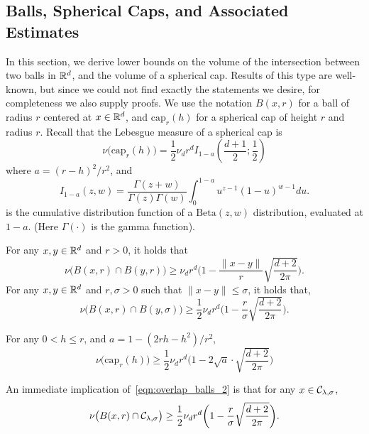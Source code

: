 \subsection{Balls, Spherical Caps, and Associated Estimates}
\label{subsec:spherical_caps}
In this section, we derive lower bounds on the volume of the intersection between two balls in $\mathbb{R}^d$, and the volume of a spherical cap. Results of this type are well-known, but since we could not find exactly the statements we desire, for completeness we also supply proofs. We use the notation $B(x,r)$ for a ball of radius $r$ centered at $x \in \mathbb{R}^d$, and $\mathrm{cap}_{r}(h)$ for a spherical cap of height $r$ and radius $r$. Recall that the Lebesgue measure of a spherical cap is
\begin{equation*}
\nu\bigl(\mathrm{cap}_r(h)\bigr) = \frac{1}{2} \nu_d r^d I_{1 - a}\left(\frac{d + 1}{2}; \frac{1}{2}\right)
\end{equation*}
where $a = (r - h)^2/r^2$, and
\begin{equation*}
I_{1 - a}(z,w) = \frac{\Gamma(z + w)}{\Gamma(z) \Gamma(w)} \int_{0}^{1 - a} u^{z - 1} (1 - u)^{w - 1} du.
\end{equation*}
is the cumulative distribution function of a $\mathrm{Beta}(z,w)$ distribution, evaluated at $1 - a$. (Here $\Gamma(\cdot)$ is the gamma function).
\begin{lemma}
	\label{lem:overlap_balls}
	For any $x,y \in \mathbb{R}^d$ and $r > 0$, it holds that
	\begin{equation}
	\label{eqn:overlap_balls_1}
	\nu\bigl(B(x,r) \cap B(y,r)\bigr) \geq \nu_d r^d\biggl(1 - \frac{\|x - y\|}{r} \sqrt{\frac{d + 2}{2\pi}}\biggr).
	\end{equation}
	For any $x,y \in \mathbb{R}^d$ and $r,\sigma > 0$ such that $\|x - y\| \leq \sigma$, it holds that,
	\begin{equation}
	\label{eqn:overlap_balls_2}
	\nu\bigl(B(x,r) \cap B(y,\sigma)\bigr) \geq \frac{1}{2} \nu_d r^d\biggl(1 - \frac{r}{\sigma}\sqrt{\frac{d + 2}{2\pi}}\biggr).
	\end{equation}
\end{lemma}
\begin{lemma}
	\label{lem:volume_of_spherical_cap}
	For any $0 < h \leq r$, and $a = 1 - (2 r h - h^2)/r^2$,
	\begin{equation*}
	\nu\bigl(\mathrm{cap}_r(h)\bigr) \geq \frac{1}{2}\nu_dr^d\bigl(1 - 2\sqrt{a} \cdot \sqrt{\frac{d + 2}{2\pi}}\bigr)
	\end{equation*}
\end{lemma}
An immediate implication of~\eqref{eqn:overlap_balls_2} is that for any $x \in \mathcal{C}_{\lambda,\sigma}$,
\begin{equation}
\label{eqn:uniform_local_conductance}
\nu\bigl(B(x,r) \cap \mathcal{C}_{\lambda,\sigma}\bigr) \geq \frac{1}{2} \nu_d r^d\biggl(1 - \frac{r}{\sigma}\sqrt{\frac{d + 2}{2\pi}}\biggr).
\end{equation}  
